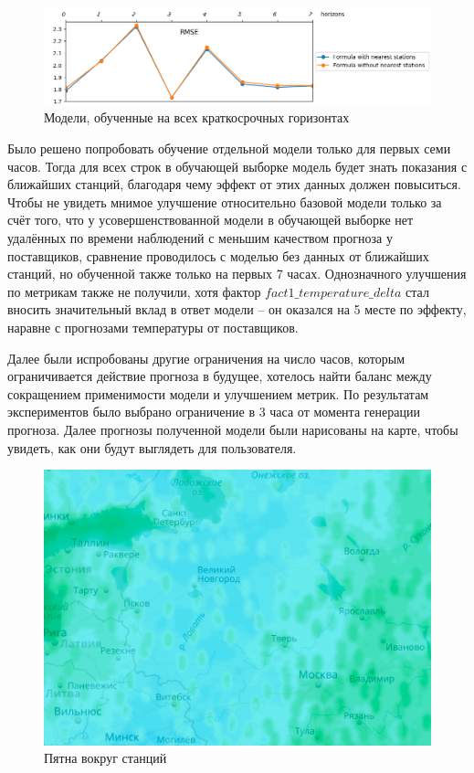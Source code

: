 \documentclass[14pt]{matmex-diploma}
\begin{document}
\begin{figure}
\centering
\includegraphics[width=\linewidth]{images/pic1_metrics_initial.png}
\caption{Модели, обученные на всех краткосрочных горизонтах}
\label{pic1_metrics_initial}
\end{figure}


Было решено попробовать обучение отдельной модели только для первых семи часов. Тогда для всех строк в обучающей выборке модель будет знать показания с ближайших станций, благодаря чему эффект от этих данных должен повыситься. Чтобы не увидеть мнимое улучшение относительно базовой модели только за счёт того, что у усовершенствованной модели в обучающей выборке нет удалённых по времени наблюдений с меньшим качеством прогноза у поставщиков, сравнение проводилось с моделью без данных от ближайших станций, но обученной также только на первых 7 часах. Однозначного улучшения по метрикам также не получили, хотя фактор $fact1\_temperature\_delta$ стал вносить значительный вклад в ответ модели -- он оказался на 5 месте по эффекту, наравне с прогнозами температуры от поставщиков.

Далее были испробованы другие ограничения на число часов, которым ограничивается действие прогноза в будущее, хотелось найти баланс между сокращением применимости модели и улучшением метрик. По результатам экспериментов было выбрано ограничение в 3 часа от момента генерации прогноза. Далее прогнозы полученной модели были нарисованы на карте, чтобы увидеть, как они будут выглядеть для пользователя.

\begin{figure}
\centering
\includegraphics[width=0.6\linewidth]{images/pic2_map.png}
\caption{Пятна вокруг станций}
\label{pic2_map}
\end{figure}
\end{document}
